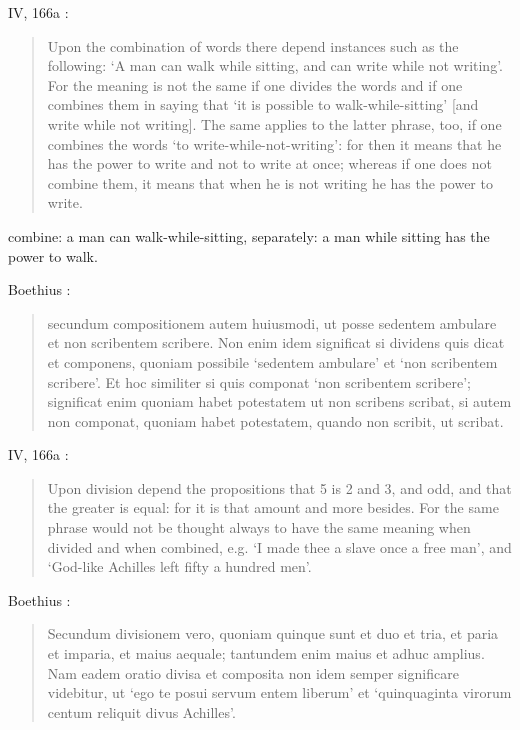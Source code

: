 \documentclass{article}
\begin{document}
IV, 166a \cite{pickard-cambridge}:

\begin{quote}
Upon the combination of words there depend instances such as the following: `A man can walk while sitting, and can write while not writing'. For the meaning is not the same if one divides the words and if one combines them in saying that `it is possible to walk-while-sitting' [and write while not writing]. The same applies to the latter phrase, too, if one combines the words `to write-while-not-writing': for then it means that he has the power to write and not to write at once; whereas if one does not combine them, it means that when he is not writing he has the power to write.
\end{quote}

combine: a man can walk-while-sitting, separately: a man while sitting has the power to walk. 

Boethius \cite[p.~9]{ALVI1to3}:

\begin{quote}
secundum compositionem autem huiusmodi, ut posse sedentem
ambulare et non scribentem scribere. Non enim idem significat
si dividens quis dicat et componens, quoniam possibile `sedentem
ambulare' et `non scribentem scribere'. Et hoc similiter
si quis componat `non scribentem scribere'; significat enim
quoniam habet potestatem ut non scribens scribat, si autem
non componat, quoniam habet potestatem, quando non scribit,
ut scribat.
\end{quote}

IV, 166a \cite{pickard-cambridge}:

\begin{quote}
Upon division depend the propositions that 5 is 2 and 3, and odd, and that the greater is equal: for it is that amount and more besides. For the same phrase would not be thought always to have the same meaning when divided and when combined, e.g. `I made thee a slave once a free man', and `God-like Achilles left fifty a hundred men'. 
\end{quote}

Boethius \cite[p.~10]{ALVI1to3}:

\begin{quote}
Secundum divisionem vero, quoniam quinque sunt et duo et
tria, et paria et imparia, et maius aequale; tantundem enim
maius et adhuc amplius. Nam eadem oratio divisa et composita
non idem semper significare videbitur, ut `ego te posui servum
entem liberum' et `quinquaginta virorum centum reliquit divus
Achilles'.
\end{quote}
\end{document}
